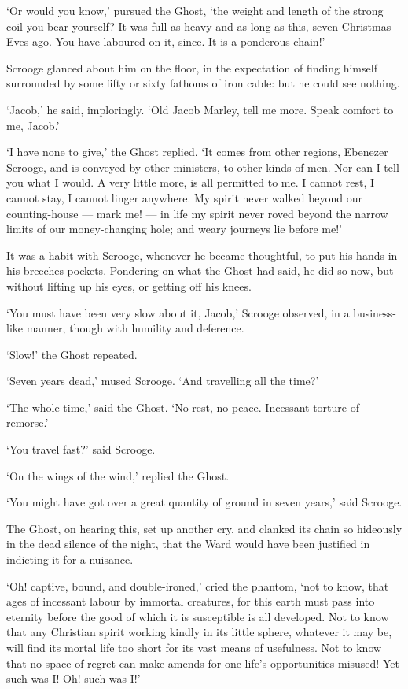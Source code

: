 \documentclass[11pt,twoside]{article}\makeatletter
\begin{document}
‘Or would you know,’ pursued the Ghost, ‘the weight and length of the strong coil you bear yourself?  It was full as heavy and as long as this, seven Christmas Eves ago.  You have laboured on it, since.  It is a ponderous chain!’\par
Scrooge glanced about him on the floor, in the expectation of finding himself surrounded by some fifty or sixty fathoms of iron cable: but he could see nothing.  \par
‘Jacob,’ he said, imploringly.  ‘Old Jacob Marley, tell me more.  Speak comfort to me, Jacob.’\par
‘I have none to give,’ the Ghost replied.  ‘It comes from other regions, Ebenezer Scrooge, and is conveyed by other ministers, to other kinds of men.  Nor can I tell you what I would.  A very little more, is all permitted to me.  I cannot rest, I cannot stay, I cannot linger anywhere.  My spirit never walked beyond our counting-house — mark me! — in life my spirit never roved beyond the narrow limits of our money-changing hole; and weary journeys lie before me!’\par
It was a habit with Scrooge, whenever he became thoughtful, to put his hands in his breeches pockets.  Pondering on what the Ghost had said, he did so now, but without lifting up his eyes, or getting off his knees.  \par
‘You must have been very slow about it, Jacob,’ Scrooge observed, in a business-like manner, though with humility and deference. \par
‘Slow!’ the Ghost repeated.  \par
‘Seven years dead,’ mused Scrooge. ‘And travelling all the time?’\par
‘The whole time,’ said the Ghost.  ‘No rest, no peace. Incessant torture of remorse.’\par
‘You travel fast?’ said Scrooge.  \par
‘On the wings of the wind,’ replied the Ghost.  \par
‘You might have got over a great quantity of ground in seven years,’ said Scrooge.  \par
The Ghost, on hearing this, set up another cry, and clanked its chain so hideously in the dead silence of the night, that the Ward would have been justified in indicting it for a nuisance.  \par
‘Oh! captive, bound, and double-ironed,’ cried the phantom, ‘not to know, that ages of incessant labour by immortal creatures, for this earth must pass into eternity before the good of which it is susceptible is all developed. Not to know that any Christian spirit working kindly in its little sphere, whatever it may be, will find its mortal life too short for its vast means of usefulness.  Not to know that no space of regret can make amends for one life's opportunities misused!  Yet such was I!  Oh! such was I!’\par
\end{document}
